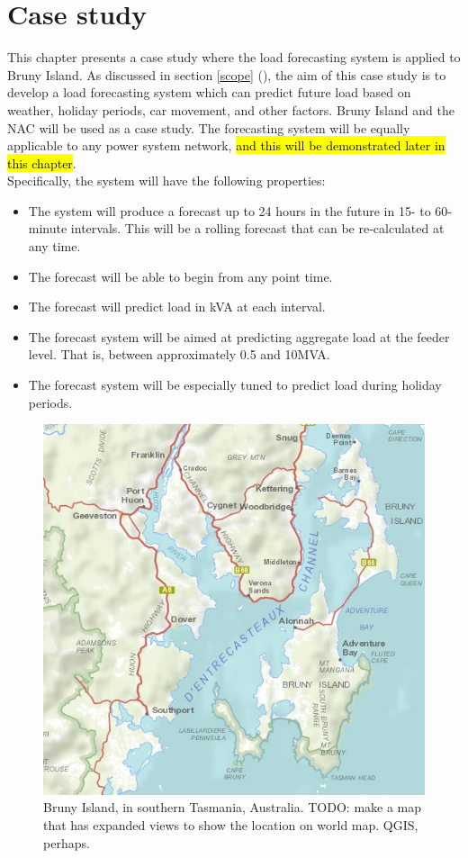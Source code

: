 \chapter{Case study}
This chapter presents a case study where the load forecasting system is applied to Bruny Island.
As discussed in section \ref{scope} (), the aim of this case study is to develop a load forecasting system which can predict future load based on weather, holiday periods, car movement, and other factors. 
Bruny Island and the NAC will be used as a case study. 
The forecasting system will be equally applicable to any power system network, \hl{and this will be demonstrated later in this chapter}.
\\
Specifically, the system will have the following properties:
\begin{itemize}
	\item The system will produce a forecast up to 24 hours in the future in 15- to 60-minute intervals. This will be a rolling forecast that can be re-calculated at any time.
	\item The forecast will be able to begin from any point time.
	\item The forecast will predict load in kVA at each interval.
	\item The forecast system will be aimed at predicting aggregate load at the feeder level. That is, between approximately 0.5 and 10MVA.
	\item The forecast system will be especially tuned to predict load during holiday periods.
\end{itemize}

\begin{figure}
	\centering
	\includegraphics[width=0.7\linewidth]{images/bruny-basic}
	\caption{Bruny Island, in southern Tasmania, Australia. TODO: make a map that has expanded views to show the location on world map. QGIS, perhaps.}
	\label{fig:bruny-basic}
\end{figure}


